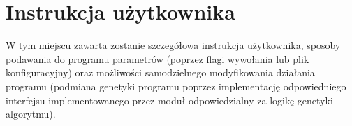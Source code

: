 \chapter{Instrukcja użytkownika}
\thispagestyle{chapterBeginStyle}

W tym miejscu zawarta zostanie szczegółowa instrukcja użytkownika, sposoby podawania do programu parametrów (poprzez flagi wywołania lub plik konfiguracyjny) oraz możliwości samodzielnego modyfikowania działania programu (podmiana genetyki programu poprzez implementację odpowiedniego interfejsu implementowanego przez moduł odpowiedzialny za logikę genetyki algorytmu).